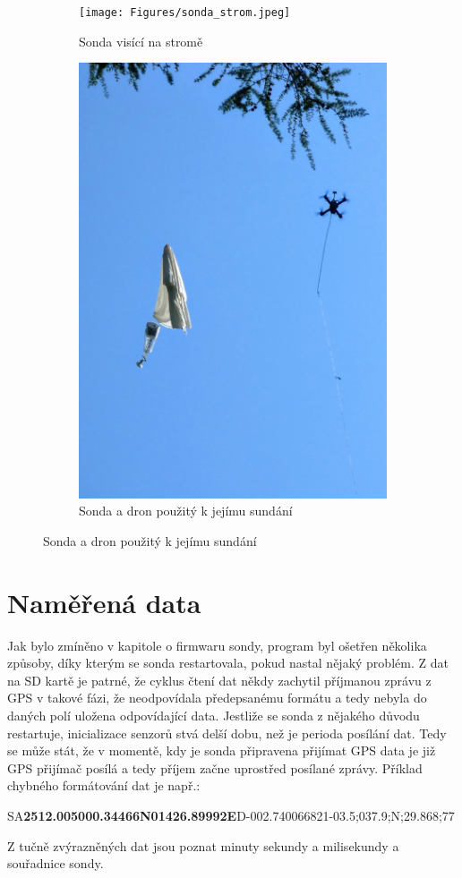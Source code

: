 \documentclass[twoside]{ctuthesis}
\theoremstyle{plain}
\theoremstyle{definition}
\theoremstyle{note}
\begin{document}
	\begin{figure}[hbtp]
		\centering
		\begin{subfigure}{.49\textwidth}
			\centering
			\texttt{[image: Figures/sonda\_strom.jpeg]}
			\caption{Sonda visící na stromě}
			\label{fig:sonda:strom}
		\end{subfigure}
		\begin{subfigure}{.49\textwidth}
			\centering
			\includegraphics[height=.8\textwidth]{Figures/sonda_dron.jpeg}
			\caption{Sonda a dron použitý k jejímu sundání}
			\label{fig:sonda:dron}			
		\end{subfigure}
	\end{figure}
	


	\section{Naměřená data}
	Jak bylo zmíněno v kapitole o firmwaru sondy, program byl ošetřen několika způsoby, díky kterým se sonda restartovala, pokud nastal nějaký problém. Z dat na SD kartě je patrné, že cyklus čtení dat někdy zachytil příjmanou zprávu z GPS v takové fázi, že neodpovídala předepsanému formátu a tedy nebyla do daných polí uložena odpovídající data. Jestliže se sonda z nějakého důvodu restartuje, inicializace senzorů stvá delší dobu, než je perioda posílání dat. Tedy se může stát, že v momentě, kdy je sonda připravena přijímat GPS data je již GPS přijímač posílá a tedy příjem začne uprostřed posílané zprávy. Příklad chybného formátování dat je např.:
	\begin{center}
		SA\textbf{2512.00}\textbf{5000.34466N01426.89992E}D-002.740066821-03.5;037.9;N;29.868;77
	\end{center}
	Z tučně zvýrazněných dat jsou poznat minuty sekundy a milisekundy a souřadnice sondy.
\end{document}
